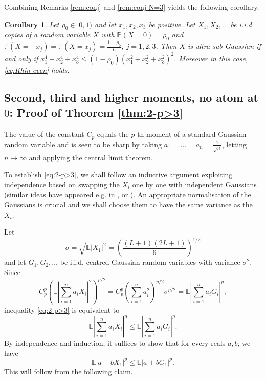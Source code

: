 \documentclass[10pt]{article}
\newcommand{\E}{\mathbb{E}}
\newcommand{\1}{\textbf{1}}
\newcommand{\p}[1]{\mathbb{P}\left( #1 \right)}
\newtheorem{corollary}[theorem]{Corollary}
\theoremstyle{remark}
\theoremstyle{definition}
\begin{document}
Combining Remarks \ref{rem:conj} and \ref{rem:conj-N=3} yields the following corollary.



\begin{corollary}\label{thm:USG-3atoms}
Let $\rho_0 \in [0,1)$ and let $x_1, x_2, x_3$ be positive. Let $X_1, X_2,\dots$ be i.i.d. copies of a random variable $X$ with $\p{X=0} = \rho_0$ and $\p{X = -x_j} = \p{X = x_j} = \frac{1-\rho_0}{6}$, $j = 1,2,3$. Then $X$ is ultra sub-Gaussian if and only if
$
x_1^4+x_2^4+x_3^4 \leq (1-\rho_0)(x_1^2+x_2^2+x_3^2)^2.
$
Moreover in this case, \eqref{eq:Khin-even} holds.
\end{corollary}



\subsection{Second, third and higher moments, no atom at $0$: Proof of Theorem \ref{thm:2-p>3}}



The value of the constant $C_p$ equals the $p$-th moment of a standard Gaussian random variable and is seen to be sharp by taking $a_1 = \ldots = a_n = \frac{1}{\sqrt{n}}$, letting $n \to \infty$ and applying the central limit theorem.

To establish \eqref{eq:2-p>3}, we shall follow an inductive argument exploiting independence based on swapping the $X_i$ one by one with independent Gaussians (similar ideas have appeared e.g. in \cite{BN}, \cite{ENT2} or \cite{FHJSZ}). An appropriate normalisation of the Gaussians is crucial and we shall choose them to have the same variance as the $X_i$. 

Let 
\begin{equation}\label{eq:def-sigma}
\sigma = \sqrt{\E |X_1|^2} = \left(\frac{(L+1)(2L+1)}{6}\right)^{1/2}
\end{equation}
and let $G_1, G_2, \ldots$ be i.i.d. centred Gaussian random variables with variance $\sigma^2$. Since
\[
C_p^p\left(\E\left|\sum_{i=1}^n a_iX_i \right|^2\right)^{p/2} = C_p^p\left(\sum_{i=1}^n a_i^2\right)^{p/2}\sigma^{p/2} = \E\left|\sum_{i=1}^n a_iG_i \right|^p,
\]
inequality \eqref{eq:2-p>3} is equivalent to
\[
\E\left|\sum_{i=1}^n a_iX_i \right|^p \leq \E\left|\sum_{i=1}^n a_iG_i \right|^p.
\]
By independence and induction, it suffices to show that for every reals $a, b$, we have
\begin{equation}\label{eq:XvsG}
\E|a+bX_1|^p \leq \E|a+bG_1|^p.
\end{equation}
This will follow from the following claim.
\end{document}
